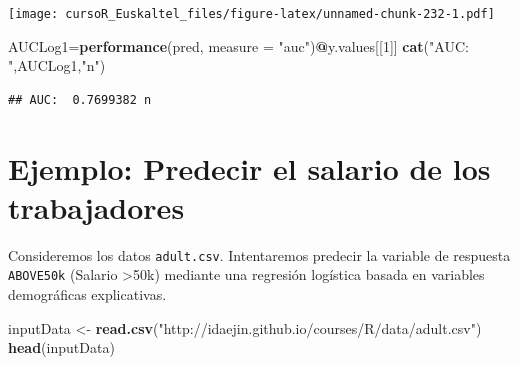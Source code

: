 \documentclass[]{book}
\newenvironment{Shaded}{\begin{snugshade}}{\end{snugshade}}
\newcommand{\KeywordTok}[1]{\textcolor[rgb]{0.13,0.29,0.53}{\textbf{#1}}}
\newcommand{\DataTypeTok}[1]{\textcolor[rgb]{0.13,0.29,0.53}{#1}}
\newcommand{\DecValTok}[1]{\textcolor[rgb]{0.00,0.00,0.81}{#1}}
\newcommand{\StringTok}[1]{\textcolor[rgb]{0.31,0.60,0.02}{#1}}
\newcommand{\OperatorTok}[1]{\textcolor[rgb]{0.81,0.36,0.00}{\textbf{#1}}}
\newcommand{\NormalTok}[1]{#1}
\begin{document}
\texttt{[image: cursoR\_Euskaltel\_files/figure-latex/unnamed-chunk-232-1.pdf]}

\begin{Shaded}
\begin{Highlighting}[]
\NormalTok{AUCLog1=}\KeywordTok{performance}\NormalTok{(pred, }\DataTypeTok{measure =} \StringTok{"auc"}\NormalTok{)}\OperatorTok{@}\NormalTok{y.values[[}\DecValTok{1}\NormalTok{]]}
\KeywordTok{cat}\NormalTok{(}\StringTok{"AUC: "}\NormalTok{,AUCLog1,}\StringTok{"n"}\NormalTok{)}
\end{Highlighting}
\end{Shaded}

\begin{verbatim}
## AUC:  0.7699382 n
\end{verbatim}

\section{Ejemplo: Predecir el salario de los
trabajadores}\label{ejemplo-predecir-el-salario-de-los-trabajadores}

Consideremos los datos \texttt{adult.csv}. Intentaremos predecir la
variable de respuesta \texttt{ABOVE50k} (Salario \textgreater{}50k)
mediante una regresión logística basada en variables demográficas
explicativas.

\begin{Shaded}
\begin{Highlighting}[]
\NormalTok{inputData <-}\StringTok{ }\KeywordTok{read.csv}\NormalTok{(}\StringTok{"http://idaejin.github.io/courses/R/data/adult.csv"}\NormalTok{)}
\KeywordTok{head}\NormalTok{(inputData)}
\end{Highlighting}
\end{Shaded}
\end{document}
